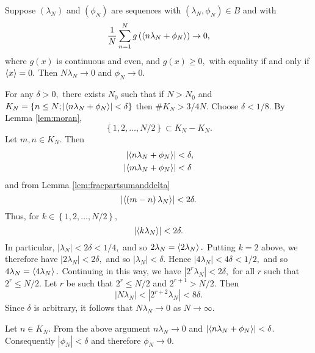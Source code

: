 \begin{lemma}
  \label{lem:moran2}Suppose $\left( \lambda_{N}\right) $ and $\left( \phi
    _{N}\right) $ are sequences with $\left( \lambda_{N},\phi_{N}\right) \in
  B$ and with%
\[
\frac{1}{N}\sum_{n=1}^{N}g\left(  \left<   n\lambda_{N}+\phi_{N}  \right>
\right)  \rightarrow 0,
\]
where $g\left(  x\right)  $ is continuous and even, and $g\left(  x\right)
\geq 0,$ with equality if and only if $\left< x \right> = 0.$ Then
$N\lambda_{N}\rightarrow0$ and $\phi_{N} \rightarrow 0.$
\end{lemma}

\begin{IEEEproof}
For any $\delta>0,$ there exists $N_{0}$ such that if $N>N_{0}$ and
$K_{N}=\left\{  n\leq N;\left\vert \left<   n\lambda_{N}+\phi_{N}  \right>
\right\vert <\delta\right\}  $ then $\#K_{N}>3/4N.$ Choose $\delta<1/8.$ By
Lemma \ref{lem:moran},
\[
\left\{  1,2,\ldots,N/2\right\}  \subset K_{N}-K_{N}.
\]
Let $m,n\in K_{N}.$ Then%
\begin{align*}
\left\vert \left<   n\lambda_{N}+\phi_{N}  \right>  \right\vert  &  <\delta,\\
\left\vert \left<   m\lambda_{N}+\phi_{N}  \right>  \right\vert  &  <\delta
\end{align*}
and from Lemma \ref{lem:fracpartsumanddelta}
\[
\left\vert \left<   \left(  m-n\right)  \lambda_{N}  \right>  \right\vert
<2\delta.
\]
Thus, for $k\in\left\{  1,2,\ldots,N/2\right\}  ,$%
\[
\left\vert \left<   k\lambda_{N}  \right>  \right\vert <2\delta.
\]
In particular, $\left\vert \lambda_{N}\right\vert <2\delta<1/4,$ and so
$2\lambda_{N}=\left< 2\lambda_{N} \right>  .$ Putting $k=2$ above, we
therefore have $\left\vert 2\lambda_{N}\right\vert <2\delta,$ and so
$\left\vert \lambda_{N}\right\vert <\delta.$ Hence $\left\vert 4\lambda
_{N}\right\vert <4\delta<1/2,$ and so $4\lambda_{N}=\left<   4\lambda
_{N}  \right>  .$ Continuing in this way, we have $\left\vert 2^{r}\lambda
_{N}\right\vert <2\delta,$ for all $r$ such that $2^{r}\leq N/2.$ Let $r$ be
such that $2^{r}\leq N/2$ and $2^{r+1}>N/2.$ Then%
\[
\left\vert N\lambda_{N}\right\vert <\left\vert 2^{r+2}\lambda_{N}\right\vert
<8\delta.
\]
Since $\delta$ is arbitrary, it follows that $N\lambda_{N}\rightarrow0$ as
$N\rightarrow\infty.$

Let $n \in K_{N}$. From the above argument $n\lambda_{N}\rightarrow0$ and $\left\vert \left<   n\lambda_{N}+\phi_{N}  \right>  \right\vert < \delta$. Consequently $\left\vert \phi_{N}\right\vert <\delta$ and therefore $\phi_{N}\rightarrow0$.
\end{IEEEproof}

